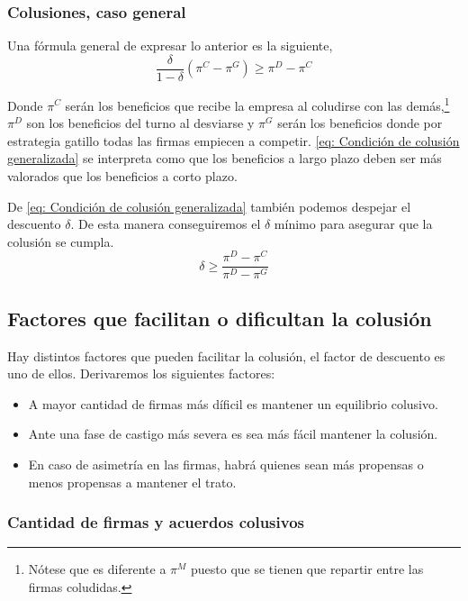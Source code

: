\subsubsection*{Colusiones, caso general}

Una fórmula general de expresar lo anterior es la siguiente,
\begin{equation}
    \frac{\delta }{1-\delta} (\pi ^C - \pi^{G}) \geq \pi ^D- \pi^C \label{eq: Condición de colusión generalizada}
\end{equation}

Donde $\pi^C$ serán los beneficios que recibe la empresa al coludirse con las demás,\footnote{Nótese que es diferente a $\pi^M$ puesto que se tienen que repartir entre las firmas coludidas.} $\pi^D$ son los beneficios del turno al desviarse y $\pi^G$ serán los beneficios donde por estrategia gatillo todas las firmas empiecen a competir. \ref{eq: Condición de colusión generalizada} se interpreta como que los beneficios a largo plazo deben ser más valorados que los beneficios a corto plazo. 

De \ref{eq: Condición de colusión generalizada} también podemos despejar el descuento $\delta$. De esta manera conseguiremos el $\delta$ mínimo para asegurar que la colusión se cumpla.
\begin{equation}
    \delta \geq \frac{\pi^D - \pi ^C}{\pi^D- \pi^G} \label{eq: Condición que tiene un nombre del que no me acuerdo ;(}
\end{equation}

\subsection{Factores que facilitan o dificultan la colusión}

Hay distintos factores que pueden facilitar la colusión, el factor de descuento es uno de ellos. Derivaremos los siguientes factores:
\begin{itemize}
    \item A mayor cantidad de firmas más díficil es mantener un equilibrio colusivo.
    \item Ante una fase de castigo más severa es sea más fácil mantener la colusión.
    \item En caso de asimetría en las firmas, habrá quienes sean más propensas o menos propensas a mantener el trato.
\end{itemize}

\subsubsection*{Cantidad de firmas y acuerdos colusivos}


